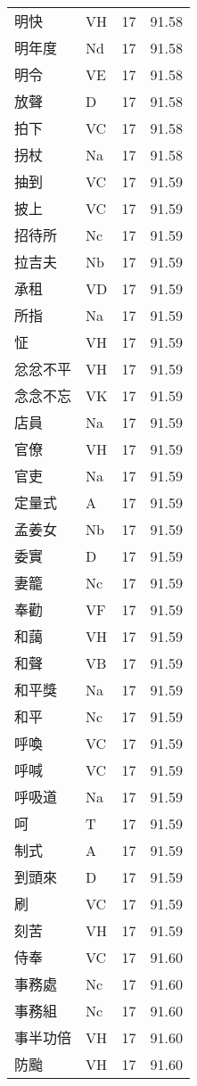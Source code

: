 \documentclass[twocolumn]{book}
\begin{document}
\begin{supertabular}{llrr}
明快 & VH & 17 &  91.58\\
明年度 & Nd & 17 &  91.58\\
明令 & VE & 17 &  91.58\\
放聲 & D & 17 &  91.58\\
拍下 & VC & 17 &  91.58\\
拐杖 & Na & 17 &  91.58\\
抽到 & VC & 17 &  91.59\\
披上 & VC & 17 &  91.59\\
招待所 & Nc & 17 &  91.59\\
拉吉夫 & Nb & 17 &  91.59\\
承租 & VD & 17 &  91.59\\
所指 & Na & 17 &  91.59\\
怔 & VH & 17 &  91.59\\
忿忿不平 & VH & 17 &  91.59\\
念念不忘 & VK & 17 &  91.59\\
店員 & Na & 17 &  91.59\\
官僚 & VH & 17 &  91.59\\
官吏 & Na & 17 &  91.59\\
定量式 & A & 17 &  91.59\\
孟姜女 & Nb & 17 &  91.59\\
委實 & D & 17 &  91.59\\
妻籠 & Nc & 17 &  91.59\\
奉勸 & VF & 17 &  91.59\\
和藹 & VH & 17 &  91.59\\
和聲 & VB & 17 &  91.59\\
和平獎 & Na & 17 &  91.59\\
和平 & Nc & 17 &  91.59\\
呼喚 & VC & 17 &  91.59\\
呼喊 & VC & 17 &  91.59\\
呼吸道 & Na & 17 &  91.59\\
呵 & T & 17 &  91.59\\
制式 & A & 17 &  91.59\\
到頭來 & D & 17 &  91.59\\
刷 & VC & 17 &  91.59\\
刻苦 & VH & 17 &  91.59\\
侍奉 & VC & 17 &  91.60\\
事務處 & Nc & 17 &  91.60\\
事務組 & Nc & 17 &  91.60\\
事半功倍 & VH & 17 &  91.60\\
防颱 & VH & 17 &  91.60\\

\end{supertabular}
\end{document}
